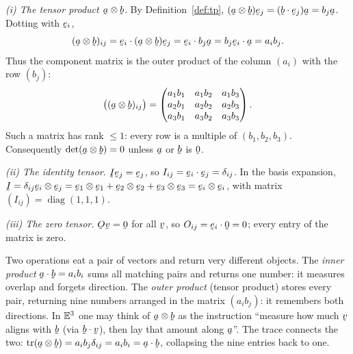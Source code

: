 \begin{example}\label{ex:tp}
\emph{(i) The tensor product $\ba\otimes\bb$.}
By Definition~\ref{def:tp},
$(\ba\otimes\bb)\be_{j}=(\ip\bb{\be_{j}})\ba=b_{j}\ba$. Dotting with
$\be_{i}$,
\[
(\ba\otimes\bb)_{ij}=\ip{\be_{i}}{(\ba\otimes\bb)\be_{j}}
=\ip{\be_{i}}{b_{j}\ba}=b_{j}\ip{\be_{i}}{\ba}=a_{i}b_{j}.
\]
Thus the component matrix is the outer product of the column $(a_i)$ with
the row $(b_j)$:
\[
\bigl((\ba\otimes\bb)_{ij}\bigr)=
\begin{pmatrix}a_{1}b_{1}&a_{1}b_{2}&a_{1}b_{3}\\
a_{2}b_{1}&a_{2}b_{2}&a_{2}b_{3}\\
a_{3}b_{1}&a_{3}b_{2}&a_{3}b_{3}\end{pmatrix}.
\]
Such a matrix has rank $\le1$: every row is a multiple of $(b_1,b_2,b_3)$.
Consequently $\det(\ba\otimes\bb)=0$ unless $\ba$ or $\bb$ is $\bze$.

\emph{(ii) The identity tensor.}
$\I\be_{j}=\be_{j}$, so $I_{ij}=\ip{\be_{i}}{\be_{j}}=\dd_{ij}$. In the
basis expansion,
$\I=\dd_{ij}\be_{i}\otimes\be_{j}=\be_{1}\otimes\be_{1}+\be_{2}\otimes\be_{2}
+\be_{3}\otimes\be_{3}=\be_{i}\otimes\be_{i}$,
with matrix $(I_{ij})=\operatorname{diag}(1,1,1)$.

\emph{(iii) The zero tensor.}
$\Ob\bv=\bze$ for all $\bv$, so $O_{ij}=\ip{\be_{i}}{\bze}=0$;
every entry of the matrix is zero.
\end{example}

\begin{remark}\label{rem:outer}
Two operations eat a pair of vectors and return very different objects.
The \emph{inner product} $\ip\ba\bb=a_ib_i$ sums all matching pairs and
returns one number: it measures overlap and forgets direction. The
\emph{outer product} (tensor product) stores every pair, returning
nine numbers arranged in the matrix $(a_ib_j)$: it remembers both
directions. In $\mathbb{E}^{3}$ one may think of $\ba\otimes\bb$ as the instruction
``measure how much $\bv$ aligns with $\bb$ (via $\ip\bb\bv$), then lay
that amount along $\ba$''. The trace connects the two:
$\tr(\ba\otimes\bb)=a_ib_j\dd_{ij}=a_ib_i=\ip\ba\bb$,
collapsing the nine entries back to one.
\end{remark}

